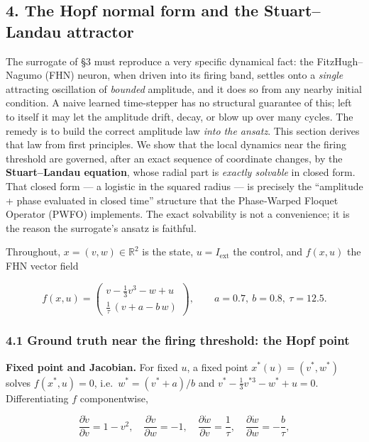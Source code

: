 \documentclass[
  11pt,
]{article}
\begin{document}
\subsection{4. The Hopf normal form and the Stuart--Landau
attractor}\label{the-hopf-normal-form-and-the-stuartlandau-attractor}

The surrogate of §3 must reproduce a very specific dynamical fact: the
FitzHugh--Nagumo (FHN) neuron, when driven into its firing band, settles
onto a \emph{single} attracting oscillation of \emph{bounded} amplitude,
and it does so from any nearby initial condition. A naive learned
time-stepper has no structural guarantee of this; left to itself it may
let the amplitude drift, decay, or blow up over many cycles. The remedy
is to build the correct amplitude law \emph{into the ansatz}. This
section derives that law from first principles. We show that the local
dynamics near the firing threshold are governed, after an exact sequence
of coordinate changes, by the \textbf{Stuart--Landau equation}, whose
radial part is \emph{exactly solvable} in closed form. That closed form
--- a logistic in the squared radius --- is precisely the ``amplitude +
phase evaluated in closed time'' structure that the Phase‑Warped Floquet
Operator (PWFO) implements. The exact solvability is not a convenience;
it is the reason the surrogate's ansatz is faithful.

Throughout, \(x=(v,w)\in\mathbb{R}^2\) is the state,
\(u=I_{\mathrm{ext}}\) the control, and \(f(x,u)\) the FHN vector field

\[
f(x,u)=\begin{pmatrix} v-\tfrac{1}{3}v^3-w+u\\[2pt] \tfrac{1}{\tau}\,(v+a-b\,w)\end{pmatrix},
\qquad a=0.7,\ b=0.8,\ \tau=12.5 .
\tag{4.0}
\]

\subsubsection{4.1 Ground truth near the firing threshold: the Hopf
point}\label{ground-truth-near-the-firing-threshold-the-hopf-point}

\textbf{Fixed point and Jacobian.} For fixed \(u\), a fixed point
\(x^*(u)=(v^*,w^*)\) solves \(f(x^*,u)=0\), i.e.~\(w^*=(v^*+a)/b\) and
\(v^*-\tfrac13 v^{*3}-w^*+u=0\). Differentiating \(f\) componentwise,

\[
\frac{\partial \dot v}{\partial v}=1-v^{2},\quad
\frac{\partial \dot v}{\partial w}=-1,\quad
\frac{\partial \dot w}{\partial v}=\frac{1}{\tau},\quad
\frac{\partial \dot w}{\partial w}=-\frac{b}{\tau},
\]
\end{document}
